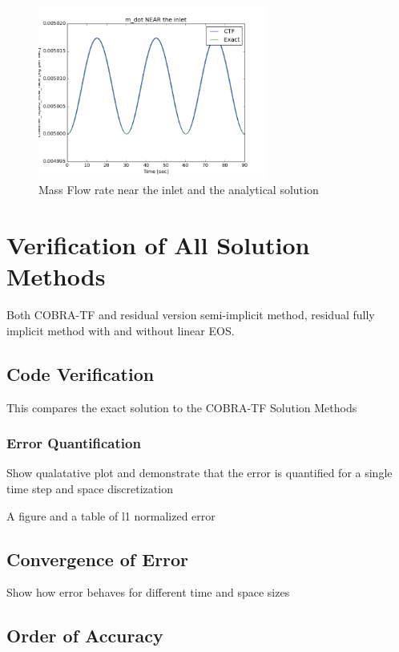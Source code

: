 \documentclass{mc2015}
\begin{document}
\begin{figure}[!h]
	\centering
	\includegraphics[width=0.675\textwidth]{images/Inlet_m_dot}
	\caption{Mass Flow rate near the inlet and the analytical solution}
	\label{fig:Inlet_m_dot}
\end{figure}

\section{Verification of All Solution Methods}

Both COBRA-TF and residual version semi-implicit method, residual fully implicit
method with and without linear EOS.

\subsection{Code Verification}

This compares the exact solution to the COBRA-TF Solution Methods

\subsubsection{Error Quantification}

Show qualatative plot and demonstrate that the error is quantified 
for a single time step and space discretization

A figure and a table of l1 normalized error

\subsection{Convergence of Error}

Show how error behaves for different time and space sizes

\subsection{Order of Accuracy}
\end{document}
